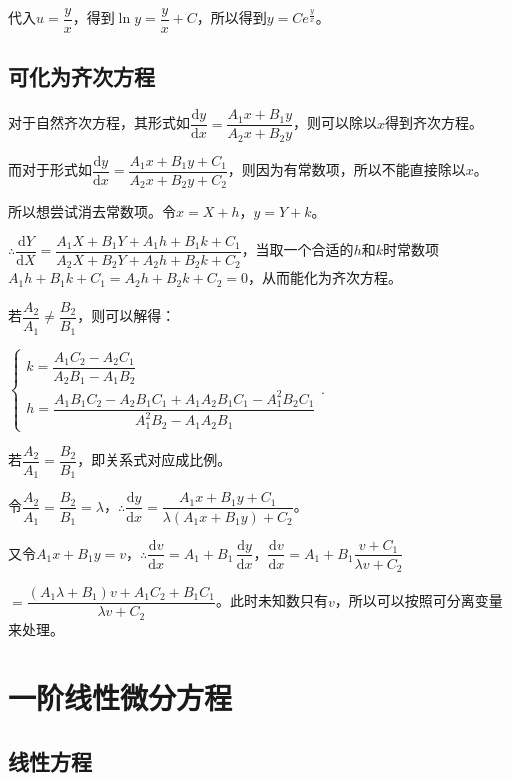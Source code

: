 \documentclass[UTF8, 12pt]{ctexart}
\begin{document}
        代入$u=\dfrac{y}{x}$，得到$\ln y=\dfrac{y}{x}+C$，所以得到$y=Ce^{\frac{y}{x}}$。

        \subsection{可化为齐次方程}

        对于自然齐次方程，其形式如$\dfrac{\textrm{d}y}{\textrm{d}x}=\dfrac{A_1x+B_1y}{A_2x+B_2y}$，则可以除以$x$得到齐次方程。

        而对于形式如$\dfrac{\textrm{d}y}{\textrm{d}x}=\dfrac{A_1x+B_1y+C_1}{A_2x+B_2y+C_2}$，则因为有常数项，所以不能直接除以$x$。

        所以想尝试消去常数项。令$x=X+h$，$y=Y+k$。\medskip

        $\therefore\dfrac{\textrm{d}Y}{\textrm{d}X}=\dfrac{A_1X+B_1Y+A_1h+B_1k+C_1}{A_2X+B_2Y+A_2h+B_2k+C_2}$，当取一个合适的$h$和$k$时常数项$A_1h+B_1k+C_1=A_2h+B_2k+C_2=0$，从而能化为齐次方程。

        若$\dfrac{A_2}{A_1}\neq\dfrac{B_2}{B_1}$，则可以解得：\medskip

        $\left\{\begin{array}{l}
                    k=\dfrac{A_1C_2-A_2C_1}{A_2B_1-A_1B_2} \\
                    h=\dfrac{A_1B_1C_2-A_2B_1C_1+A_1A_2B_1C_1-A_1^2B_2C_1}{A_1^2B_2-A_1A_2B_1}
        \end{array}
        \right.$.

        若$\dfrac{A_2}{A_1}=\dfrac{B_2}{B_1}$，即关系式对应成比例。

        令$\dfrac{A_2}{A_1}=\dfrac{B_2}{B_1}=\lambda$，$\therefore\dfrac{\textrm{d}y}{\textrm{d}x}=\dfrac{A_1x+B_1y+C_1}{\lambda(A_1x+B_1y)+C_2}$。

        又令$A_1x+B_1y=v$，$\therefore\dfrac{\textrm{d}v}{\textrm{d}x}=A_1+B_1\,\dfrac{\textrm{d}y}{\textrm{d}x}$，$\dfrac{\textrm{d}v}{\textrm{d}x}=A_1+B_1\dfrac{v+C_1}{\lambda v+C_2}$

        $=\dfrac{(A_1\lambda+B_1)v+A_1C_2+B_1C_1}{\lambda v+C_2}$。此时未知数只有$v$，所以可以按照可分离变量来处理。

        \section{一阶线性微分方程}

        \subsection{线性方程}
\end{document}
